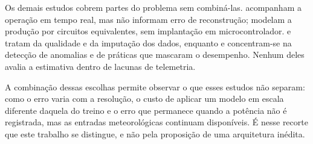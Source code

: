 Os demais estudos cobrem partes do problema sem combiná-las.
 acompanham a operação em tempo real,
mas não informam erro de reconstrução;  modelam
a produção por circuitos equivalentes, sem implantação em microcontrolador.
 e 
tratam da qualidade e da imputação dos dados, enquanto
 e  concentram-se na
detecção de anomalias e de práticas que mascaram o desempenho. Nenhum deles
avalia a estimativa dentro de lacunas de telemetria.

A combinação dessas escolhas permite observar o que esses estudos não separam:
como o erro varia com a resolução, o custo de aplicar um modelo em
escala diferente daquela do treino e o erro que permanece quando a potência
não é registrada, mas as entradas meteorológicas continuam disponíveis. É
nesse recorte que este trabalho se distingue, e não pela proposição de uma
arquitetura inédita.

